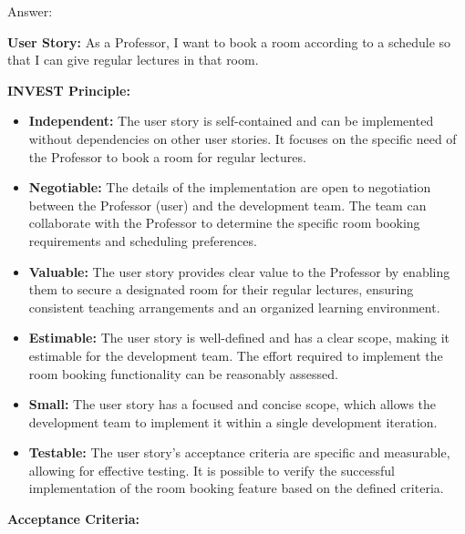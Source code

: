 \documentclass[conference,onecolumn]{IEEEtran}
\begin{document}
Answer:
\begin{framed}
	\small
	\textbf{User Story:} As a Professor, I want to book a room according to a schedule so that I can give regular lectures in that room.
	
	\textbf{INVEST Principle:}
	
	\begin{itemize}
		\item \textbf{Independent:} The user story is self-contained and can be implemented without dependencies on other user stories. It focuses on the specific need of the Professor to book a room for regular lectures.
		
		\item \textbf{Negotiable:} The details of the implementation are open to negotiation between the Professor (user) and the development team. The team can collaborate with the Professor to determine the specific room booking requirements and scheduling preferences.
		
		\item \textbf{Valuable:} The user story provides clear value to the Professor by enabling them to secure a designated room for their regular lectures, ensuring consistent teaching arrangements and an organized learning environment.
		
		\item \textbf{Estimable:} The user story is well-defined and has a clear scope, making it estimable for the development team. The effort required to implement the room booking functionality can be reasonably assessed.
		
		\item \textbf{Small:} The user story has a focused and concise scope, which allows the development team to implement it within a single development iteration.
		
		\item \textbf{Testable:} The user story's acceptance criteria are specific and measurable, allowing for effective testing. It is possible to verify the successful implementation of the room booking feature based on the defined criteria.
	\end{itemize}
	
	\textbf{Acceptance Criteria:}
	

\end{framed}
\end{document}

